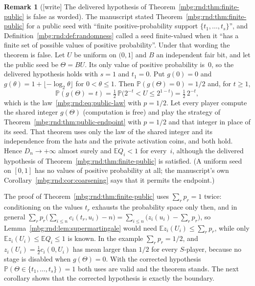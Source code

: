 \documentclass[11pt,letterpaper]{article}
\theoremstyle{definition}
\newtheorem{remark}[theorem]{Remark}
\newcommand{\E}{\mathbb E}
\newcommand{\Prb}{\mathbb P}
\begin{document}
\begin{remark}[{[write]} The delivered hypothesis of Theorem~\ref{mbg:rnd:thm:finite-public} is false as worded]
\label{mbg:rnd:rem:finite-valued}
The manuscript stated Theorem~\ref{mbg:rnd:thm:finite-public} for a public seed with ``finite positive-probability support $\{t_1,\ldots,t_s\}$'', and Definition~\ref{mbg:rnd:def:randomness} called a seed finite-valued when it ``has a finite set of possible values of positive probability''. Under that wording the theorem is false. Let $U$ be uniform on $(0,1]$ and $B$ an independent fair bit, and let the public seed be $\Theta=BU$. Its only value of positive probability is~$0$, so the delivered hypothesis holds with $s=1$ and $t_1=0$. Put $g(0)=0$ and $g(\theta)=1+\lfloor-\log_2\theta\rfloor$ for $0<\theta\le1$. Then $\Prb(g(\Theta)=0)=1/2$ and, for $t\ge1$,
\[
 \Prb(g(\Theta)=t)=\tfrac12\,\Prb\bigl(2^{-t}<U\le2^{1-t}\bigr)=\tfrac12\,2^{-t},
\]
which is the law~\eqref{mbg:rnd:eq:public-law} with $p=1/2$. Let every player compute the shared integer $g(\Theta)$ (computation is free) and play the strategy of Theorem~\ref{mbg:rnd:thm:public-endpoint} with $p=1/2$ and that integer in place of its seed. That theorem uses only the law of the shared integer and its independence from the hats and the private activation coins, and both hold. Hence $D_n\to+\infty$ almost surely and $\E Q_i<1$ for every~$i$, although the delivered hypothesis of Theorem~\ref{mbg:rnd:thm:finite-public} is satisfied. (A uniform seed on $[0,1]$ has no values of positive probability at all; the manuscript's own Corollary~\ref{mbg:rnd:cor:coarsening} says that it permits the endpoint.)

The proof of Theorem~\ref{mbg:rnd:thm:finite-public} uses $\sum_rp_r=1$ twice: conditioning on the values $t_r$ exhausts the probability space only then, and in general $\sum_rp_r\bigl(\sum_{i\le n}c_i(t_r,u_i)-n\bigr)=\sum_{i\le n}\bigl(z_i(u_i)-\sum_rp_r\bigr)$, so Lemma~\ref{mbg:rnd:lem:supermartingale} would need $\E z_i(U_i)\le\sum_rp_r$, while only $\E z_i(U_i)\le\E Q_i\le1$ is known. In the example $\sum_rp_r=1/2$, and $z_i(U_i)=\tfrac12c_i(0,U_i)$ has mean larger than $1/2$ for every $S$-player, because no stage is disabled when $g(\Theta)=0$. With the corrected hypothesis $\Prb(\Theta\in\{t_1,\ldots,t_s\})=1$ both uses are valid and the theorem stands. The next corollary shows that the corrected hypothesis is exactly the boundary.
\end{remark}
\end{document}
